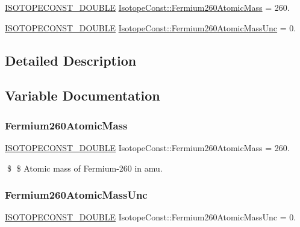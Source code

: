 \begin{DoxyCompactItemize}
\item 
\mbox{\hyperlink{group___isotope_const-_macros_ga8f45a7272ce02c0b4c65c44636ed719a}{I\+S\+O\+T\+O\+P\+E\+C\+O\+N\+S\+T\+\_\+\+D\+O\+U\+B\+LE}} \mbox{\hyperlink{group___isotope_const-_fermium-_fm260_ga3e8cd3caf56e1efe6e4d64841067909a}{Isotope\+Const\+::\+Fermium260\+Atomic\+Mass}} = 260.
\item 
\mbox{\hyperlink{group___isotope_const-_macros_ga8f45a7272ce02c0b4c65c44636ed719a}{I\+S\+O\+T\+O\+P\+E\+C\+O\+N\+S\+T\+\_\+\+D\+O\+U\+B\+LE}} \mbox{\hyperlink{group___isotope_const-_fermium-_fm260_ga9597b08b3733437db94858ba6c735991}{Isotope\+Const\+::\+Fermium260\+Atomic\+Mass\+Unc}} = 0.
\end{DoxyCompactItemize}


\subsection{Detailed Description}


\subsection{Variable Documentation}
\mbox{\label{group___isotope_const-_fermium-_fm260_ga3e8cd3caf56e1efe6e4d64841067909a}} 
\subsubsection{\texorpdfstring{Fermium260\+Atomic\+Mass}{Fermium260AtomicMass}}
{\footnotesize\ttfamily \mbox{\hyperlink{group___isotope_const-_macros_ga8f45a7272ce02c0b4c65c44636ed719a}{I\+S\+O\+T\+O\+P\+E\+C\+O\+N\+S\+T\+\_\+\+D\+O\+U\+B\+LE}} Isotope\+Const\+::\+Fermium260\+Atomic\+Mass = 260.}

\$ \$ Atomic mass of Fermium-\/260 in amu. \mbox{\label{group___isotope_const-_fermium-_fm260_ga9597b08b3733437db94858ba6c735991}} 
\subsubsection{\texorpdfstring{Fermium260\+Atomic\+Mass\+Unc}{Fermium260AtomicMassUnc}}
{\footnotesize\ttfamily \mbox{\hyperlink{group___isotope_const-_macros_ga8f45a7272ce02c0b4c65c44636ed719a}{I\+S\+O\+T\+O\+P\+E\+C\+O\+N\+S\+T\+\_\+\+D\+O\+U\+B\+LE}} Isotope\+Const\+::\+Fermium260\+Atomic\+Mass\+Unc = 0.}


